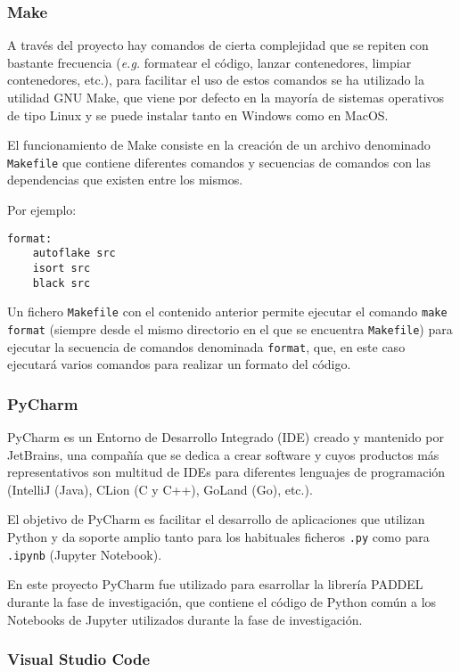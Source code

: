 \subsubsection{Make}

A través del proyecto hay comandos de cierta complejidad que se repiten con
bastante frecuencia (\textit{e.g.} formatear el código, lanzar contenedores,
limpiar contenedores, etc.), para facilitar el uso de estos comandos se ha
utilizado la utilidad GNU Make, que viene por defecto en la mayoría de sistemas
operativos de tipo Linux y se puede instalar tanto en Windows como en MacOS.

El funcionamiento de Make consiste en la creación de un archivo denominado
\texttt{Makefile} que contiene diferentes comandos y secuencias de comandos con
las dependencias que existen entre los mismos.

Por ejemplo:

\begin{verbatim}
format:
    autoflake src
    isort src
    black src
\end{verbatim}

Un fichero \texttt{Makefile} con el contenido anterior permite ejecutar el
comando \texttt{make format} (siempre desde el mismo directorio en el que se
encuentra \texttt{Makefile}) para ejecutar la secuencia de comandos denominada
\texttt{format}, que, en este caso ejecutará varios comandos para realizar un
formato del código.

\subsubsection{PyCharm}

PyCharm es un Entorno de Desarrollo Integrado (IDE) creado y mantenido por
JetBrains, una compañía que se dedica a crear software y cuyos productos más
representativos son multitud de IDEs para diferentes lenguajes de programación
(IntelliJ (Java), CLion (C y C++), GoLand (Go), etc.).

El objetivo de PyCharm es facilitar el desarrollo de aplicaciones que utilizan
Python y da soporte amplio tanto para los habituales ficheros \texttt{.py} como
para \texttt{.ipynb} (Jupyter Notebook).

En este proyecto PyCharm fue utilizado para esarrollar la librería PADDEL
durante la fase de investigación, que contiene el código de Python común a los
Notebooks de Jupyter utilizados durante la fase de investigación.

\subsubsection{Visual Studio Code}

